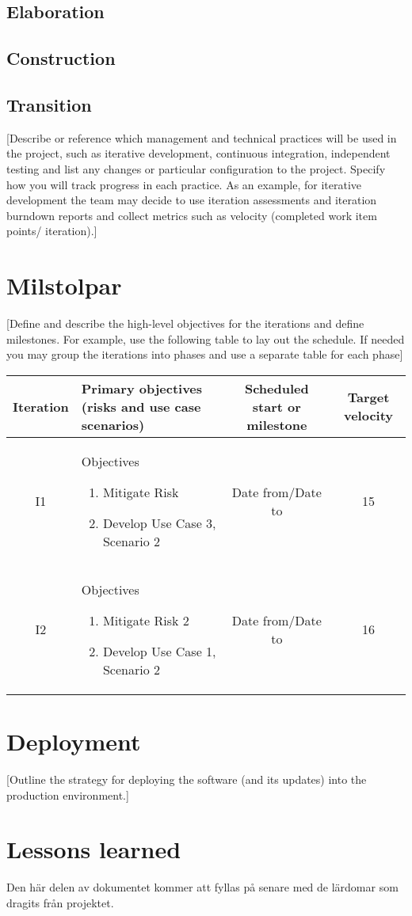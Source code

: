 \subsection*{Elaboration}

\subsection*{Construction}

\subsection*{Transition}
[Describe or reference which management and technical practices will be used in the project, such as iterative development, continuous integration, independent testing and list any changes or particular configuration to the project. Specify how you will track progress in each practice. As an example, for iterative development the team may decide to use iteration assessments and iteration burndown reports and collect metrics such as velocity (completed work item points/ iteration).]

\section{Milstolpar}
[Define and describe the high-level objectives for the iterations and define milestones. For example, use the following table to lay out the schedule. If needed you may group the iterations into phases and use a separate table for each phase]
\begin{center}
    \begin{tabular}{ | c | m{6cm}  | c | c |}
    \hline
    Iteration & Primary objectives (risks and use case scenarios) & Scheduled start or milestone & Target velocity \\
    \hline
    I1 & Objectives \begin{enumerate} \item Mitigate Risk \item Develop Use Case 3, Scenario 2 \end{enumerate} & Date from/Date to & 15 \\
    \hline
	I2 & Objectives \begin{enumerate} \item Mitigate Risk 2 \item Develop Use Case 1, Scenario 2 \end{enumerate} & Date from/Date to & 16 \\
\hline
    \end{tabular}
\end{center}

\section{Deployment}
[Outline the strategy for deploying the software (and its updates) into the production environment.]

\section{Lessons learned}
Den här delen av dokumentet kommer att fyllas på senare med de lärdomar som dragits från projektet.



